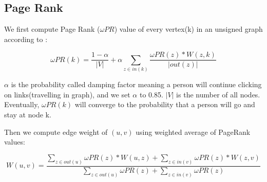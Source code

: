 
\subsection{Page Rank}

We first compute Page Rank ($\omega PR$) value of every vertex(k) in an unsigned graph according to \cite{brin1998anatomy}:

\begin{equation}
\omega PR(k) = \frac{1 - \alpha}{\left | V \right|} + \alpha \sum_{z\in in(k)}\frac{\omega PR(z) * W(z,k)}{\left | out(z) \right |}
\end{equation}

$\alpha$ is the probability called damping factor meaning a person will continue clicking on links(travelling in graph), and we set $\alpha$ to 0.85. $\left |V\right |$ is the number of all nodes. Eventually, $\omega PR(k)$ will converge to the probability that a person will go and stay at node k.

Then we compute edge weight of $(u,v)$ using weighted average of PageRank values:

\begin{equation}
W(u,v) = \frac{\sum_{z\in out(u)} \omega PR(z)*W(u,z) + \sum_{z\in in(v)} \omega PR(z)*W(z,v)}
{\sum_{z\in out(u)}\omega PR(z) + \sum_{z\in in(v)}\omega PR(z)}
\end{equation}

